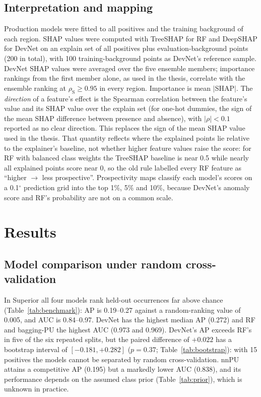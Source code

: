 \documentclass[pdflatex,sn-apa]{sn-jnl}
\begin{document}
\subsection{Interpretation and mapping}\label{sec:shap}

Production models were fitted to all positives and the training background of each region. SHAP values \citep{Lundberg2017} were computed with TreeSHAP for RF \citep{Lundberg2020} and DeepSHAP for DevNet on an explain set of all positives plus evaluation-background points (200 in total), with 100 training-background points as DevNet's reference sample. DevNet SHAP values were averaged over the five ensemble members; importance rankings from the first member alone, as used in the thesis, correlate with the ensemble ranking at $\rho_{\mathrm{S}} \geq 0.95$ in every region. Importance is mean $|$SHAP$|$. The \emph{direction} of a feature's effect is the Spearman correlation between the feature's value and its SHAP value over the explain set (for one-hot dummies, the sign of the mean SHAP difference between presence and absence), with $|\rho| < 0.1$ reported as no clear direction. This replaces the sign of the mean SHAP value used in the thesis. That quantity reflects where the explained points lie relative to the explainer's baseline, not whether higher feature values raise the score: for RF with balanced class weights the TreeSHAP baseline is near 0.5 while nearly all explained points score near 0, so the old rule labelled every RF feature as ``higher $\rightarrow$ less prospective''. Prospectivity maps classify each model's scores on a 0.1$^\circ$ prediction grid into the top 1\%, 5\% and 10\%, because DevNet's anomaly score and RF's probability are not on a common scale.

\section{Results}\label{sec:results}

\subsection{Model comparison under random cross-validation}\label{sec:res-random}

In Superior all four models rank held-out occurrences far above chance (Table~\ref{tab:benchmark}): AP is 0.19--0.27 against a random-ranking value of 0.005, and AUC is 0.84--0.97. DevNet has the highest median AP (0.272) and RF and bagging-PU the highest AUC (0.973 and 0.969). DevNet's AP exceeds RF's in five of the six repeated splits, but the paired difference of $+0.022$ has a bootstrap interval of $[-0.181, +0.282]$ ($p = 0.37$; Table~\ref{tab:bootstrap}): with 15 positives the models cannot be separated by random cross-validation. nnPU attains a competitive AP (0.195) but a markedly lower AUC (0.838), and its performance depends on the assumed class prior (Table~\ref{tab:prior}), which is unknown in practice.
\end{document}
